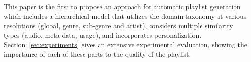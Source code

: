 This paper is the first to propose an approach for automatic  playlist generation which includes a hierarchical model that utilizes the domain taxonomy at various resolutions (global, genre, sub-genre and artist), considers multiple similarity types (audio, meta-data, usage), and incorporates personalization. Section~\ref{sec:experiments} gives an extensive experimental evaluation, showing the importance of each of these parts to the quality of the playlist. 
 



%
%
%  	
%
